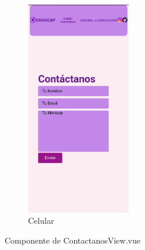 \begin{figure} [H]
\begin{subfigure}{0.4\textwidth}
                        \includegraphics[width=0.5\textwidth]{Imagenes/Página Web/Celular/Contactos.jpg}
                        \caption{Celular}
                        \label{fig:pw5.2}
                    \end{subfigure}
                    \hfill
                            
                    \caption{Componente de ContactanosView.vue}
                    \label{fig:pw5}
                    \end{figure}
                    
